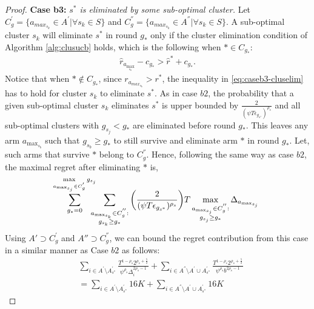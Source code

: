 \begin{proof}
\textbf{Case b3:} \textit{$s^{*}$ is eliminated by some sub-optimal cluster.} 
Let $C_{g}^{'}=\lbrace a_{max_{s_{k}}}\in A^{'}|\forall s_{k}\in S \rbrace$ and $C_{g}^{''}=\lbrace a_{max_{s_{k}}}\in A^{''}|\forall s_{k}\in S \rbrace$. A sub-optimal cluster $s_k$ will eliminate $s^*$ in round $g_*$ only if the cluster elimination condition of Algorithm \ref{alg:clusucb} holds, which is the following when ${*}\in C_{g_{*}}$:
\begin{align}
\hat r_{a_{\max_{s_k}}} - c_{g_*} > \hat{r}^{*}+ c_{g_*}.
\label{eq:caseb3-cluselim}
\end{align}
Notice that when ${*}\notin C_{g_{*}}$, since $r_{a_{max_{s_{k}}}}>r^{*}$, the inequality in \eqref{eq:caseb3-cluselim} has to hold for cluster $s_k$ to eliminate $s^*$.
As in case $b2$, the probability that a given sub-optimal cluster $s_k$ eliminates $s^*$ is upper bounded by  $\frac{2}{(\psi T\epsilon_{g_{s^{*}}})^{\rho_{s}}}$ and all sub-optimal clusters with $g_{s_{j}}< g_{*}$ are eliminated before round $g_*$. This leaves any arm $a_{\max_{s_{b}}}$ such that $g_{s_{b}}\geq g_{*}$ to still survive and eliminate arm ${*}$ in round $g_{*}$. Let, such arms that survive ${*}$ belong to $C_{g}^{''}$. Hence, following the same way as case $b2$,  the maximal regret after eliminating ${*}$ is,
 \begin{align*}
 \!\!\sum_{g_{*}=0}^{\max\limits_{a_{\max_{s_{j}}}\in C_{g}^{'}}g_{s_{j}}}\!\!\!\!\!\sum_{\substack{\scriptsize a_{\max_{s_{k}}}\in C_{g}^{''}: \\ g_{s_{k}} \geq g_{*}}}\bigg(\dfrac{2}{(\psi T\epsilon_{g_{s^{*}}})^{\rho_{s}}} \bigg)T\max_{\substack{a_{\max_{s_{j}}}\in C_{g}^{''}: \\ g_{s_{j}}\geq g_{*}}}{\Delta}_{a_{\max_{s_{j}}}}
 \end{align*}
Using $A'\supset C_{g}^{'}$ and $A''\supset C_{g}^{''}$, we can bound the regret contribution from this case in a similar manner as Case $b2$ as follows:
\begin{align*}
 &\!\!\sum_{i\in A^{'}\setminus A_{s^*}^{'}}\frac{T^{1-\rho_{s}}2^{\rho_{s}+\frac{5}{2}}}{\psi^{\rho_{s}}\Delta_{i}^{2\rho_{s}-1}} 
 \!+\!\!\!\sum_{i\in A^{''}\setminus A^{'}\cup A_{s^*}^{'}}\!\!\!\!\frac{T^{1-\rho_{s}}2^{\rho_{s}+\frac{5}{2}}}{\psi^{\rho_{s}}b^{2\rho_{s}-1}} \\
 & = \sum_{i\in A^{'}\setminus A_{s^*}^{'}} 16K +\sum_{i\in A^{''}\setminus A^{'}\cup A_{s^*}^{'}} 16K
\end{align*}


\end{proof}
